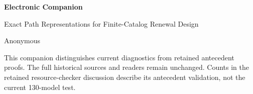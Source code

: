 \documentclass[11pt,letterpaper]{article}
\theoremstyle{definition}\newtheorem{remark}[theorem]{Remark}
\begin{document}
\begin{center}{\Large\bfseries Electronic Companion}\par Exact Path Representations for Finite-Catalog Renewal Design\par Anonymous\end{center}
This companion distinguishes current diagnostics from retained antecedent proofs. The full historical sources and readers remain unchanged. Counts in the retained resource-checker discussion describe its antecedent validation, not the current 130-model test.\par






\clearpage
\clearpage
\end{document}

